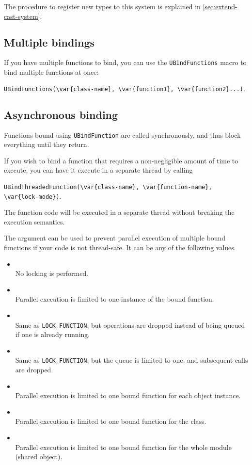 The procedure to register new types to this system is explained in
\autoref{sec:extend-cast-system}.

\subsection{Multiple bindings}
If you have multiple functions to bind, you can use the
\lstinline|UBindFunctions| macro to bind multiple functions at once:

\lstinline|UBindFunctions(\var{class-name}, \var{function1}, \var{function2}...)|.

\subsection{Asynchronous binding}
\label{sec:uobject:asynchronous-binding}
Functions bound using \lstinline{UBindFunction} are called synchronously, and
thus block everything until they return.

If you wish to bind a function that requires a non-negligible amount of time
to execute, you can have it execute in a separate thread by calling

\lstinline|UBindThreadedFunction(\var{class-name}, \var{function-name}, \var{lock-mode})|.

The function code will be executed in a separate thread without breaking the
\us execution semantics.

The  argument can be used to prevent parallel execution of
multiple bound functions if your code is not thread-safe. It can be any of
the following values.
\begin{itemize}
\item {}\\
  No locking is performed.
\item {}\\
  Parallel execution is limited to one instance of the bound function.
\item {}\\
  Same as \lstinline{LOCK_FUNCTION}, but operations are dropped instead of
  being queued if one is already running.
\item {}\\
  Same as \lstinline{LOCK_FUNCTION}, but the queue is limited to one, and
  subsequent calls are dropped.
\item {}\\
  Parallel execution is limited to one bound function for each object
  instance.
\item {}\\
  Parallel execution is limited to one bound function for the class.
\item {}\\
  Parallel execution is limited to one bound function for the whole module
  (shared object).
\end{itemize}

